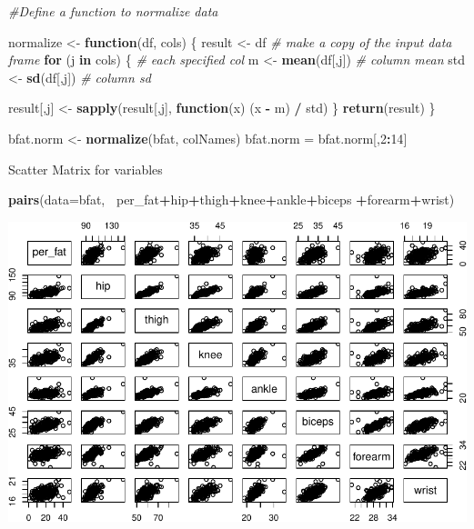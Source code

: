 \documentclass[]{article}
\newenvironment{Shaded}{\begin{snugshade}}{\end{snugshade}}
\newcommand{\KeywordTok}[1]{\textcolor[rgb]{0.13,0.29,0.53}{\textbf{#1}}}
\newcommand{\DataTypeTok}[1]{\textcolor[rgb]{0.13,0.29,0.53}{#1}}
\newcommand{\DecValTok}[1]{\textcolor[rgb]{0.00,0.00,0.81}{#1}}
\newcommand{\StringTok}[1]{\textcolor[rgb]{0.31,0.60,0.02}{#1}}
\newcommand{\CommentTok}[1]{\textcolor[rgb]{0.56,0.35,0.01}{\textit{#1}}}
\newcommand{\ControlFlowTok}[1]{\textcolor[rgb]{0.13,0.29,0.53}{\textbf{#1}}}
\newcommand{\OperatorTok}[1]{\textcolor[rgb]{0.81,0.36,0.00}{\textbf{#1}}}
\newcommand{\NormalTok}[1]{#1}
\begin{document}
\begin{Shaded}
\begin{Highlighting}[]
\CommentTok{#Define a function to normalize data}

\NormalTok{normalize <-}\StringTok{ }\ControlFlowTok{function}\NormalTok{(df, cols) \{}
\NormalTok{  result <-}\StringTok{ }\NormalTok{df }\CommentTok{# make a copy of the input data frame}
    \ControlFlowTok{for}\NormalTok{ (j }\ControlFlowTok{in}\NormalTok{ cols) \{ }\CommentTok{# each specified col}
\NormalTok{    m <-}\StringTok{ }\KeywordTok{mean}\NormalTok{(df[,j]) }\CommentTok{# column mean}
\NormalTok{    std <-}\StringTok{ }\KeywordTok{sd}\NormalTok{(df[,j]) }\CommentTok{# column sd}

\NormalTok{    result[,j] <-}\StringTok{ }\KeywordTok{sapply}\NormalTok{(result[,j], }\ControlFlowTok{function}\NormalTok{(x) (x }\OperatorTok{-}\StringTok{ }\NormalTok{m) }\OperatorTok{/}\StringTok{ }\NormalTok{std)}
\NormalTok{    \}}
    \KeywordTok{return}\NormalTok{(result)}
\NormalTok{    \}}
    
\NormalTok{    bfat.norm <-}\StringTok{ }\KeywordTok{normalize}\NormalTok{(bfat, colNames)}
\NormalTok{    bfat.norm =}\StringTok{ }\NormalTok{bfat.norm[,}\DecValTok{2}\OperatorTok{:}\DecValTok{14}\NormalTok{]}
\end{Highlighting}
\end{Shaded}

Scatter Matrix for variables

\begin{Shaded}
\begin{Highlighting}[]
\KeywordTok{pairs}\NormalTok{(}\DataTypeTok{data=}\NormalTok{bfat, }\OperatorTok{~}\NormalTok{per_fat}\OperatorTok{+}\NormalTok{hip}\OperatorTok{+}\NormalTok{thigh}\OperatorTok{+}\NormalTok{knee}\OperatorTok{+}\NormalTok{ankle}\OperatorTok{+}\NormalTok{biceps}
      \OperatorTok{+}\NormalTok{forearm}\OperatorTok{+}\NormalTok{wrist)}
\end{Highlighting}
\end{Shaded}

\includegraphics{BodyFat_files/figure-latex/unnamed-chunk-13-1.pdf}
\end{document}
